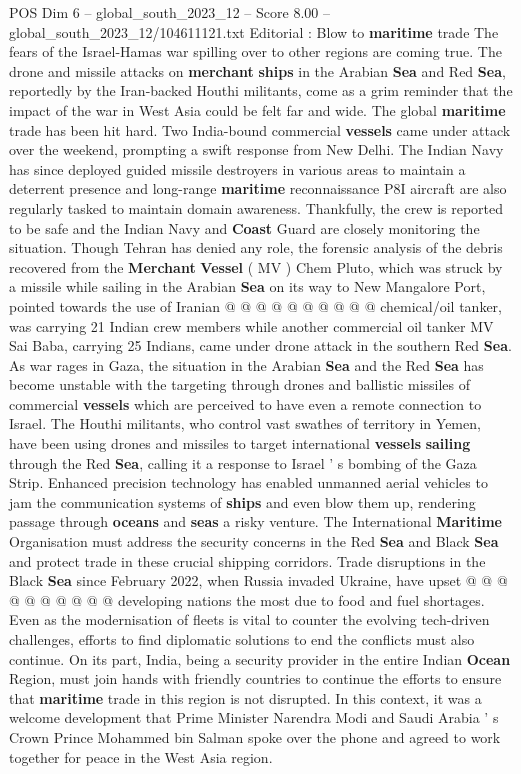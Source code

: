 \begin{textsample}{POS Dim 6 – global\_south\_2023\_12 – Score 8.00 – global\_south\_2023\_12/104611121.txt}  \label{ex:f6_pos_127}
Editorial : Blow to \textbf{maritime} trade The fears of the Israel-Hamas war spilling over to other regions are coming true.
The drone and missile attacks on \textbf{merchant} \textbf{ships} in the Arabian \textbf{Sea} and Red \textbf{Sea}, reportedly by the Iran-backed Houthi militants, come as a grim reminder that the impact of the war in West Asia could be felt far and wide.
The global \textbf{maritime} trade has been hit hard.
Two India-bound commercial \textbf{vessels} came under attack over the weekend, prompting a swift response from New Delhi.
The Indian Navy has since deployed guided missile destroyers in various areas to maintain a deterrent presence and long-range \textbf{maritime} reconnaissance P8I aircraft are also regularly tasked to maintain domain awareness.
Thankfully, the crew is reported to be safe and the Indian Navy and \textbf{Coast} Guard are closely monitoring the situation.
Though Tehran has denied any role, the forensic analysis of the debris recovered from the \textbf{Merchant} \textbf{Vessel} ( MV ) Chem Pluto, which was struck by a missile while sailing in the Arabian \textbf{Sea} on its way to New Mangalore Port, pointed towards the use of Iranian @ @ @ @ @ @ @ @ @ @ chemical/oil tanker, was carrying 21 Indian crew members while another commercial oil tanker MV Sai Baba, carrying 25 Indians, came under drone attack in the southern Red \textbf{Sea}.
As war rages in Gaza, the situation in the Arabian \textbf{Sea} and the Red \textbf{Sea} has become unstable with the targeting through drones and ballistic missiles of commercial \textbf{vessels} which are perceived to have even a remote connection to Israel.
The Houthi militants, who control vast swathes of territory in Yemen, have been using drones and missiles to target international \textbf{vessels} \textbf{sailing} through the Red \textbf{Sea}, calling it a response to Israel ' s bombing of the Gaza Strip.
Enhanced precision technology has enabled unmanned aerial vehicles to jam the communication systems of \textbf{ships} and even blow them up, rendering passage through \textbf{oceans} and \textbf{seas} a risky venture.
The International \textbf{Maritime} Organisation must address the security concerns in the Red \textbf{Sea} and Black \textbf{Sea} and protect trade in these crucial shipping corridors.
Trade disruptions in the Black \textbf{Sea} since February 2022, when Russia invaded Ukraine, have upset @ @ @ @ @ @ @ @ @ @ developing nations the most due to food and fuel shortages.
Even as the modernisation of fleets is vital to counter the evolving tech-driven challenges, efforts to find diplomatic solutions to end the conflicts must also continue.
On its part, India, being a security provider in the entire Indian \textbf{Ocean} Region, must join hands with friendly countries to continue the efforts to ensure that \textbf{maritime} trade in this region is not disrupted.
In this context, it was a welcome development that Prime Minister Narendra Modi and Saudi Arabia ' s Crown Prince Mohammed bin Salman spoke over the phone and agreed to work together for peace in the West Asia region.

\end{textsample}
